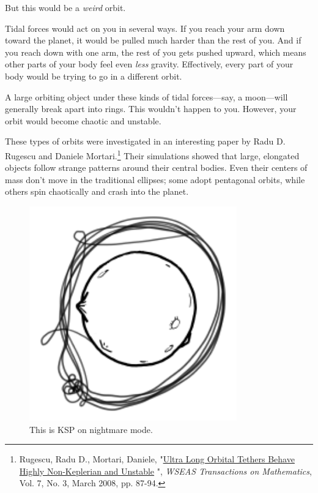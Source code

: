 {{But this would be a \emph{weird} orbit.}

{Tidal forces would act on you in several ways. If you reach your arm down toward the planet, it would be pulled much harder than the rest of you. And if you reach down with one arm, the rest of you gets pushed upward, which means other parts of your body feel even \emph{less} gravity. Effectively, every part of your body would be trying to go in a different orbit.}

{A large orbiting object under these kinds of tidal forces—say, a moon—will generally break apart into rings. This wouldn't happen to you. However, your orbit would become chaotic and unstable.}

{These types of orbits were investigated in an interesting paper by Radu D. Rugescu and Daniele Mortari.{\footnote{Rugescu, Radu D., Mortari, Daniele, "\href{http://www.academia.edu/3453325/Ultra\_Long\_Orbital\_Tethers\_Behave\_Highly\_Non-Keplerian\_and\_Unstable}{Ultra Long Orbital Tethers Behave Highly Non-Keplerian and Unstable} ", \emph{WSEAS Transactions on Mathematics}, Vol. 7, No. 3, March 2008, pp. 87-94.} } Their simulations showed that large, elongated objects follow strange patterns around their central bodies. Even their centers of mass don't move in the traditional ellipses; some adopt pentagonal orbits, while others spin chaotically and crash into the planet.}

\begin{figure}[!htbp]
\centering
\includegraphics[scale=0.5, max width=0.8\textwidth]{imgs/a/68/asteroid_chaotic.png}
\caption{This is KSP on nightmare mode.}
\end{figure}

}
